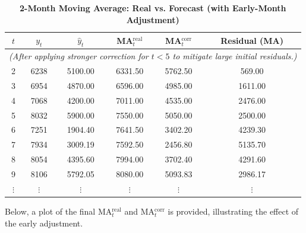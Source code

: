 \documentclass[10pt]{article}
\begin{document}
\begin{table}[H]
\centering

\label{tab:2monthMA}
\begin{tabular}{cccccc}
\toprule
\(t\) & \(y_t\) & \(\hat{y}_t\) & MA\(_t^{\mathrm{real}}\) & MA\(_t^{\mathrm{corr}}\) & Residual (MA) \\
\midrule
\multicolumn{6}{l}{\textit{(After applying stronger correction for \(t<5\) to mitigate large initial residuals.)}}\\
\midrule
2 & 6238 & 5100.00 & 6331.50 & 5762.50 & 569.00 \\
3 & 6954 & 4870.00 & 6596.00 & 4985.00 & 1611.00 \\
4 & 7068 & 4200.00 & 7011.00 & 4535.00 & 2476.00 \\
5 & 8032 & 5900.00 & 7550.00 & 5050.00 & 2500.00 \\
6 & 7251 & 1904.40 & 7641.50 & 3402.20 & 4239.30 \\
7 & 7934 & 3009.19 & 7592.50 & 2456.80 & 5135.70 \\
8 & 8054 & 4395.60 & 7994.00 & 3702.40 & 4291.60 \\
9 & 8106 & 5792.05 & 8080.00 & 5093.83 & 2986.17 \\
\(\vdots\) & \(\vdots\) & \(\vdots\) & \(\vdots\) & \(\vdots\) & \(\vdots\) \\
\bottomrule
\end{tabular}
\caption{\textbf{2-Month Moving Average: Real vs. Forecast (with Early-Month Adjustment)}}
\end{table}

Below, a plot of the final MA\(_t^{\mathrm{real}}\) and MA\(_t^{\mathrm{corr}}\) is provided, illustrating the effect of the early adjustment.
\end{document}
